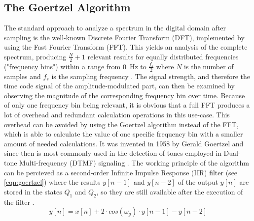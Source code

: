 \documentclass[conference]{IEEEtran}
\begin{document}
\subsection{The Goertzel Algorithm}
The standard approach to analyze a spectrum in the digital domain after sampling is the well-known Discrete Fourier Transform (DFT), implemented by using
the Fast Fourier Transform (FFT). This yields an analysis of the complete spectrum, producing $\frac{N}{2} + 1$ relevant results for equally distributed frequencies
("frequency bins") within a range from \SI{0}{\hertz} to $\frac{f_{s}}{2}$ where $N$ is the number of samples and $f_{s}$ is the sampling frequency \cite{b6}.
The signal strength, and therefore the time code signal of the amplitude-modulated part, can then be examined by observing the magnitude of the corresponding frequency bin
over time. Because of only one frequency bin being relevant, it is obvious that a full FFT produces a lot of overhead and redundant calculation operations in this use-case. 
This overhead can be avoided by using the Goertzel algorithm instead of the FFT, which is able to calculate the value of one specific frequency bin with a smaller
amount of needed calculations.
It was invented in 1958 by Gerald Goertzel and since then is most commonly used in the detection of tones employed in Dual-tone Multi-frequency (DTMF) signaling \cite{b7}.
The working principle of the algorithm can be percieved as a second-order Infinite Impulse Response (IIR) filter (see \eqref{eqn:goertzel}) where the results $y[n-1]$ and $y[n-2]$ of the output $y[n]$
are stored in the states $Q_{1}$ and $Q_{2}$, so they are still available after the execution of the filter \cite{b8}.
\begin{equation}
    y[n] = x[n] + 2 \cdot cos(\omega_{g}) \cdot y[n-1] - y[n-2]
    \label{eqn:goertzel}
\end{equation}
\end{document}

